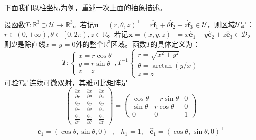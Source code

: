 \documentclass[main.tex]{subfiles}
\begin{document}
下面我们以柱坐标为例，重述一次上面的抽象描述。

\begin{example}[柱坐标]
    设函数$T:\mathbb{R}^3\supset\mathcal{U}\rightarrow\mathbb{R}^3$。若记$\mathbf{u}=\left(r,\theta,z\right)^\intercal=r\mathbf{\hat{f}}_1+\theta\mathbf{\hat{f}}_2+z\mathbf{\hat{f}}_3\in\mathcal{U}$，则区域$\mathcal{U}$是：$r\in\left(0,+\infty\right),\theta\in\left[0,2\pi\right),z\in\mathbb{R}$。若记$\mathbf{x}=\left(x,y,z\right)^\intercal=x\mathbf{\hat{e}}_1+y\mathbf{\hat{e}}_2+z\mathbf{\hat{e}}_3\in\mathcal{D}$，则$\mathcal{D}$是除直线$x=y=0$外的整个$\mathbb{R}^3$区域。函数$T$的具体定义为：
    \begin{equation*}
        T:\left\{\begin{array}{l}
            x=r\cos \theta \\
            y=r\sin \theta \\
            z=z\end{array}\right.,T^{-1}
        \left\{\begin{array}{l}
            r=\sqrt{x^2+y^2}               \\
            \theta=\arctan\left(y/x\right) \\
            z=z\end{array}\right.
    \end{equation*}
    可验$T$是连续可微双射，其雅可比矩阵是
    \[
        \left(\begin{array}{ccc}
                \frac{\partial x}{\partial r} & \frac{\partial x}{\partial \theta} & \frac{\partial x}{\partial z} \\
                \frac{\partial y}{\partial r} & \frac{\partial y}{\partial \theta} & \frac{\partial y}{\partial z} \\
                \frac{\partial z}{\partial r} & \frac{\partial z}{\partial\theta}  & \frac{\partial z}{\partial z}
            \end{array}\right)=\left(\begin{array}{ccc}
                \cos\theta & -r\sin\theta & 0 \\
                \sin\theta & r\cos\theta  & 0 \\
                0          & 0            & 1\end{array}\right)
    \]
    \begin{equation*}
        \begin{array}{lll}
            \mathbf{c}_1=\left(\cos\theta,\sin\theta,0\right)^\intercal,    & h_1=1, & \mathbf{\hat{c}}_1=\left(\cos\theta,\sin\theta,0\right)^\intercal  \\

\end{array}
\end{equation*}
\end{example}
\end{document}
